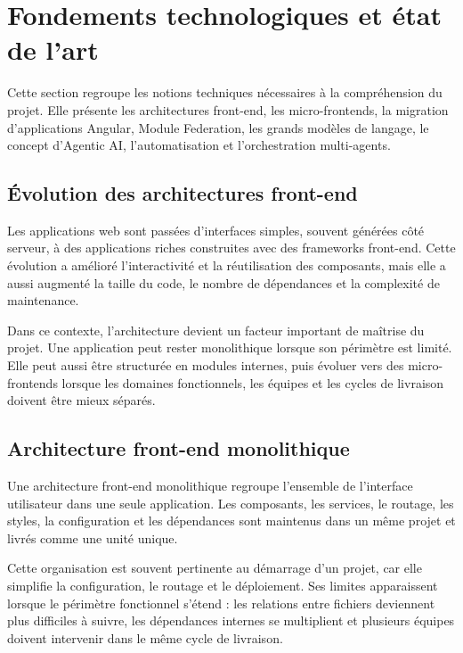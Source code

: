 \section{Fondements technologiques et état de l'art}

Cette section regroupe les notions techniques nécessaires à la compréhension du projet. Elle présente les architectures front-end, les micro-frontends, la migration d'applications Angular, Module Federation, les grands modèles de langage, le concept d'Agentic AI, l'automatisation et l'orchestration multi-agents.

\subsection{Évolution des architectures front-end}

Les applications web sont passées d'interfaces simples, souvent générées côté serveur, à des applications riches construites avec des frameworks front-end. Cette évolution a amélioré l'interactivité et la réutilisation des composants, mais elle a aussi augmenté la taille du code, le nombre de dépendances et la complexité de maintenance.

Dans ce contexte, l'architecture devient un facteur important de maîtrise du projet. Une application peut rester monolithique lorsque son périmètre est limité. Elle peut aussi être structurée en modules internes, puis évoluer vers des micro-frontends lorsque les domaines fonctionnels, les équipes et les cycles de livraison doivent être mieux séparés.

\subsection{Architecture front-end monolithique}

Une architecture front-end monolithique regroupe l'ensemble de l'interface utilisateur dans une seule application. Les composants, les services, le routage, les styles, la configuration et les dépendances sont maintenus dans un même projet et livrés comme une unité unique.

Cette organisation est souvent pertinente au démarrage d'un projet, car elle simplifie la configuration, le routage et le déploiement. Ses limites apparaissent lorsque le périmètre fonctionnel s'étend : les relations entre fichiers deviennent plus difficiles à suivre, les dépendances internes se multiplient et plusieurs équipes doivent intervenir dans le même cycle de livraison.

